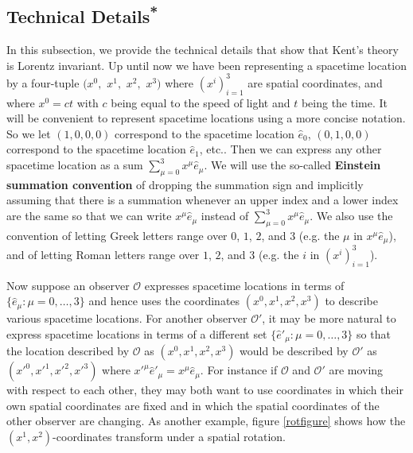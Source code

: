 \documentclass[12pt]{report}
\begin{document}
\subsection{Technical Details\textsuperscript{*}}
In this subsection, we provide the technical details that show that Kent's theory is Lorentz invariant. Up until now we have been representing a spacetime location by a four-tuple $(x^0,$ $x^1,$ $x^2,$ $x^3)$ where $(x^i)_{i=1}^3$ are spatial coordinates, and where $x^0=ct$ with $c$ being equal to the speed of light and $t$ being the time. It will be convenient to represent spacetime locations using a more concise notation. So we let $(1,0,0,0)$ correspond to the spacetime location $\hat{e}_0$, $(0,1,0,0)$ %
%
 correspond to the spacetime location $\hat{e}_1$, etc.. Then we can express any other spacetime location  as a sum $\sum_{\mu=0}^3x^\mu\hat{e}_\mu$. We will use the so-called \textbf{Einstein summation convention}\label{Einsteinsum} of dropping the summation sign and implicitly assuming that there is a summation whenever an upper index and a lower index are the same so that we can write $x^\mu\hat{e}_\mu$ %
  instead of $\sum_{\mu=0}^3x^\mu\hat{e}_\mu$. We also use the convention of letting Greek letters range over $0$, $1$, $2$, and $3$ (e.g. the $\mu$ in $x^\mu\hat{e}_\mu$), and of letting Roman letters range over $1$, $2$, and $3$ (e.g. the $i$ in $(x^i)_{i=1}^3$). %

Now suppose an observer $\mathcal{O}$ %
%
 expresses spacetime locations in terms of $\{\hat{e}_\mu:\mu=0,\ldots,3\}$ and hence uses the coordinates $(x^0, x^1, x^2, x^3)$ to describe various spacetime locations. For another observer $\mathcal{O}'$, it may be more natural to express spacetime locations in terms of a different set $\{\hat{e}'_\mu:\mu=0,\ldots,3\}$ so that the location described by $\mathcal{O}$ as $(x^0, x^1, x^2, x^3)$ would be described by $\mathcal{O}'$ as $({x'}^0, {x'}^1, {x'}^2, {x'}^3)$ where ${x'}^\mu{\hat{e}'}_\mu=x^\mu\hat{e}_\mu$.  For instance if $\mathcal{O}$ and $\mathcal{O}'$ are moving with respect to each other, they may both want to use coordinates in which their own spatial coordinates are fixed and in which the spatial coordinates of the other observer are changing. As another example, figure \ref{rotfigure} shows how the $(x^1, x^2)$-coordinates transform under a spatial rotation. 
\end{document}
